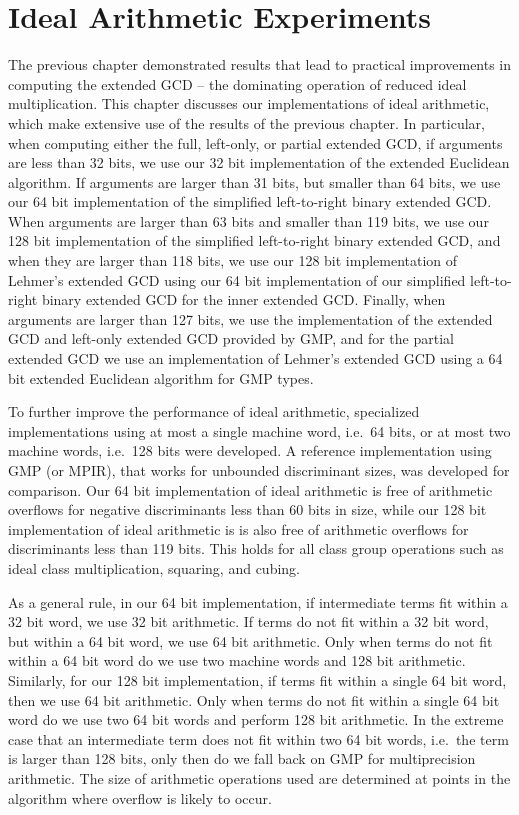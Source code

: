 \documentclass{ucalgthes1}
\theoremstyle{definition}
\begin{document}
\chapter{Ideal Arithmetic Experiments}
\label{chap:idealExperiments}

The previous chapter demonstrated results that lead to practical improvements in computing the extended GCD -- the dominating operation of reduced ideal multiplication.  This chapter discusses our implementations of ideal arithmetic, which make extensive use of the results of the previous chapter.  In particular, when computing either the full, left-only, or partial extended GCD, if arguments are less than 32 bits, we use our 32 bit implementation of the extended Euclidean algorithm.  If arguments are larger than 31 bits, but smaller than 64 bits, we use our 64 bit implementation of the simplified left-to-right binary extended GCD.  When arguments are larger than 63 bits and smaller than 119 bits, we use our 128 bit implementation of the simplified left-to-right binary extended GCD, and when they are larger than 118 bits, we use our 128 bit implementation of Lehmer's extended GCD using our 64 bit implementation of our simplified left-to-right binary extended GCD for the inner extended GCD.  Finally, when arguments are larger than 127 bits, we use the implementation of the extended GCD and left-only extended GCD provided by GMP, and for the partial extended GCD we use an implementation of Lehmer's extended GCD using a 64 bit extended Euclidean algorithm for GMP types.

To further improve the performance of ideal arithmetic, specialized implementations using at most a single machine word, i.e.\ 64 bits, or at most two machine words, i.e.\ 128 bits were developed.  A reference implementation using GMP (or MPIR), that works for unbounded discriminant sizes, was developed for comparison.  Our 64 bit implementation of ideal arithmetic is free of arithmetic overflows for negative discriminants less than 60 bits in size, while our 128 bit implementation of ideal arithmetic is is also free of arithmetic overflows for discriminants less than 119 bits.  This holds for all class group operations such as ideal class multiplication, squaring, and cubing.

As a general rule, in our 64 bit implementation, if intermediate terms fit within a 32 bit word, we use 32 bit arithmetic.  If terms do not fit within a 32 bit word, but within a 64 bit word, we use 64 bit arithmetic.  Only when terms do not fit within a 64 bit word do we use two machine words and 128 bit arithmetic.  Similarly, for our 128 bit implementation, if terms fit within a single 64 bit word, then we use 64 bit arithmetic.  Only when terms do not fit within a single 64 bit word do we use two 64 bit words and perform 128 bit arithmetic.  In the extreme case that an intermediate term does not fit within two 64 bit words, i.e.\ the term is larger than 128 bits, only then do we fall back on GMP for multiprecision arithmetic.  The size of arithmetic operations used are determined at points in the algorithm where overflow is likely to occur.
\end{document}
